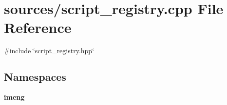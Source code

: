 \section{sources/script\+\_\+registry.cpp File Reference}
\label{script__registry_8cpp}
{\ttfamily \#include \char`\"{}script\+\_\+registry.\+hpp\char`\"{}}\newline
\subsection*{Namespaces}
\begin{DoxyCompactItemize}
\item 
 \textbf{ imeng}
\end{DoxyCompactItemize}
